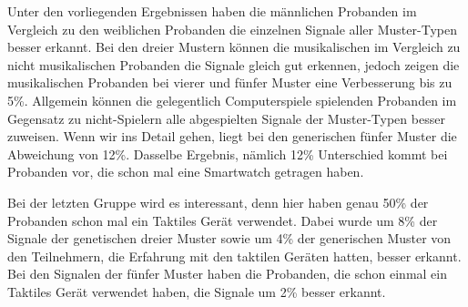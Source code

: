 Unter den vorliegenden Ergebnissen haben die m{\"a}nnlichen Probanden im Vergleich zu den weiblichen Probanden die einzelnen Signale aller Muster-Typen besser erkannt.
Bei den dreier Mustern k{\"o}nnen die musikalischen im Vergleich zu nicht musikalischen Probanden die Signale gleich gut erkennen, jedoch zeigen die musikalischen Probanden bei vierer und f{\"u}nfer Muster eine Verbesserung bis zu 5\%.
Allgemein k{\"o}nnen die gelegentlich Computerspiele spielenden Probanden im Gegensatz zu nicht-Spielern alle abgespielten Signale der Muster-Typen besser zuweisen. Wenn wir ins Detail gehen, liegt bei den generischen f{\"u}nfer Muster die Abweichung von 12\%.
Dasselbe Ergebnis, n{\"a}mlich 12\% Unterschied kommt bei Probanden vor, die schon mal eine Smartwatch getragen haben.

Bei der letzten Gruppe wird es interessant, denn hier haben genau 50\% der Probanden schon mal ein Taktiles Ger{\"a}t verwendet. 
Dabei wurde um 8\% der Signale der genetischen dreier Muster sowie um 4\% der generischen Muster von den Teilnehmern, die Erfahrung mit den taktilen Ger{\"a}ten hatten, besser erkannt.
Bei den Signalen der f{\"u}nfer Muster haben die Probanden, die schon einmal ein Taktiles Ger{\"a}t verwendet haben, die Signale um 2\% besser erkannt.

